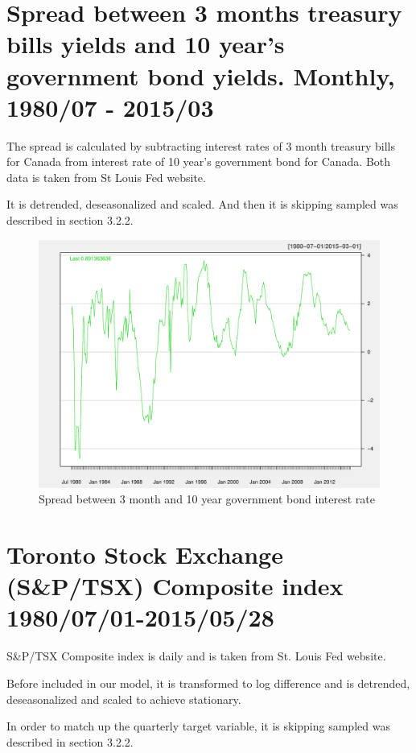\section{Spread between 3 months treasury bills yields and 10 year's government bond yields. Monthly, 1980/07 - 2015/03} 



The spread is calculated by subtracting interest rates of 3 month treasury bills for Canada from interest rate of 10 year's government bond for Canada. Both data is taken from St Louis Fed website.


It is detrended, deseasonalized and scaled. And then it is skipping sampled  was described in section 3.2.2. 


\begin{figure}
	\centering
	\includegraphics[width=0.7\linewidth]{Figures/spread-report}
	\caption{Spread between 3 month and 10 year government bond interest rate}
	\label{fig:spread-report}
\end{figure}



\section{Toronto Stock Exchange (S\&P/TSX) Composite index 1980/07/01-2015/05/28}


S\&P/TSX Composite index is daily and is taken from St. Louis Fed website.

Before included in our model, it is transformed to log difference and is detrended, deseasonalized and scaled to achieve stationary. 

In order to match up the quarterly target variable, it is skipping sampled  was described in section 3.2.2. 

